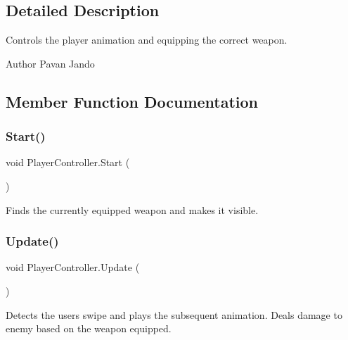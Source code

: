 \subsection{Detailed Description}
Controls the player animation and equipping the correct weapon. 

\begin{DoxyAuthor}{Author}
Pavan Jando
\end{DoxyAuthor}


\subsection{Member Function Documentation}
\mbox{\label{class_player_controller_ae1117d9c4da3193181cddad2c814e467}} 
\subsubsection{\texorpdfstring{Start()}{Start()}}
{\footnotesize\ttfamily void Player\+Controller.\+Start (\begin{DoxyParamCaption}{ }\end{DoxyParamCaption})\hspace{0.3cm}{\ttfamily [private]}}



Finds the currently equipped weapon and makes it visible. 

\mbox{\label{class_player_controller_ae8bc83dffb99867a04be016473ed2c43}} 
\subsubsection{\texorpdfstring{Update()}{Update()}}
{\footnotesize\ttfamily void Player\+Controller.\+Update (\begin{DoxyParamCaption}{ }\end{DoxyParamCaption})\hspace{0.3cm}{\ttfamily [private]}}



Detects the users swipe and plays the subsequent animation. Deals damage to enemy based on the weapon equipped. 



